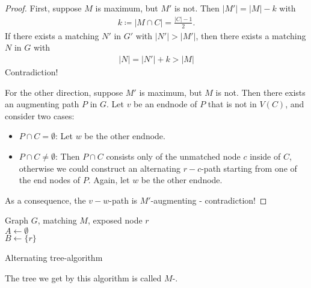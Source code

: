 \begin{proof}
    First, suppose $M$ is maximum, but $M'$ is not. Then $|M'|=|M|-k$ with
    \begin{align*}
        k \coloneqq |M \cap C| = \frac{|C|-1}{2}.
    \end{align*}
    If there exists a matching $N'$ in $G'$ with $|N'|>|M'|$, then there exists a matching $N$ in $G$
    with
    \begin{align*}
        |N| = |N'|+k > |M|
    \end{align*}
    Contradiction!

    For the other direction, suppose $M'$ is maximum, but $M$ is not.
    Then there exists an augmenting path $P$ in $G$.
    Let $v$ be an endnode of $P$ that is not in $V(C)$, and consider two cases:
    \begin{itemize}
        \item $P \cap C = \emptyset$: Let $w$ be the other endnode.
        \item $P \cap C \neq \emptyset$: Then $P \cap C$ consists only of the unmatched node $c$ inside of $C$,
              otherwise we could construct an alternating $r-c$-path starting from one of the end nodes of $P$.
              Again, let $w$ be the other endnode.
    \end{itemize}
    As a consequence, the $v-w$-path is $M'$-augmenting - contradiction!
\end{proof}
\begin{algorithm}[H] \label{algo:alt_tree}
    \SetAlgoLined
    Graph $G$, matching $M$, exposed node $r$\\
    $A \leftarrow \emptyset$\\
    $B \leftarrow \{r\}$\\
    \caption{Alternating tree-algorithm}
\end{algorithm} \noindent
\begin{definition}
    The tree we get by this algorithm is called $M$-.
\end{definition}
